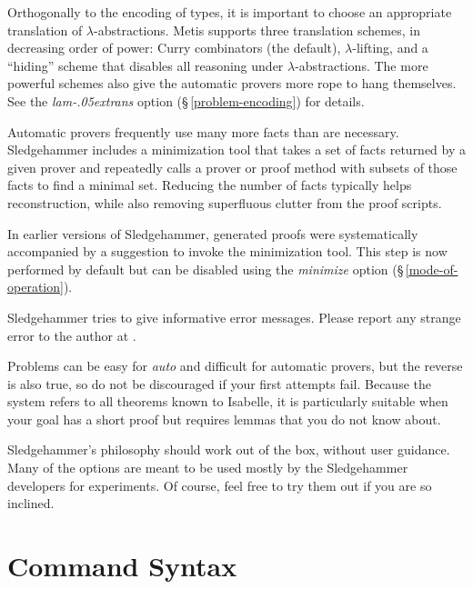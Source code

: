 \documentclass[a4paper,12pt]{article}
\let\oldS=\S
\def\S{\oldS\,}
\renewcommand\_{\hbox{\textunderscore\kern-.05ex}}
\begin{document}
Orthogonally to the encoding of types, it is important to choose an appropriate
translation of $\lambda$-abstractions. Metis supports three translation schemes,
in decreasing order of power: Curry combinators (the default),
$\lambda$-lifting, and a ``hiding'' scheme that disables all reasoning under
$\lambda$-abstractions. The more powerful schemes also give the automatic
provers more rope to hang themselves. See the \textit{lam\_trans} option (\S\ref{problem-encoding}) for details.



Automatic provers frequently use many more facts than are necessary.
Sledgehammer includes a minimization tool that takes a set of facts returned by
a given prover and repeatedly calls a prover or proof method with subsets of
those facts to find a minimal set. Reducing the number of facts typically helps
reconstruction, while also removing superfluous clutter from the proof scripts.

In earlier versions of Sledgehammer, generated proofs were systematically
accompanied by a suggestion to invoke the minimization tool. This step is now
performed by default but can be disabled using the \textit{minimize} option
(\S\ref{mode-of-operation}).



Sledgehammer tries to give informative error messages. Please report any strange
error to the author at \authoremail.



Problems can be easy for \textit{auto} and difficult for automatic provers, but
the reverse is also true, so do not be discouraged if your first attempts fail.
Because the system refers to all theorems known to Isabelle, it is particularly
suitable when your goal has a short proof but requires lemmas that you do not
know about.



Sledgehammer's philosophy should work out of the box, without user guidance.
Many of the options are meant to be used mostly by the Sledgehammer developers
for experiments. Of course, feel free to try them out if you are so inclined.


\section{Command Syntax}
\label{command-syntax}
\end{document}
